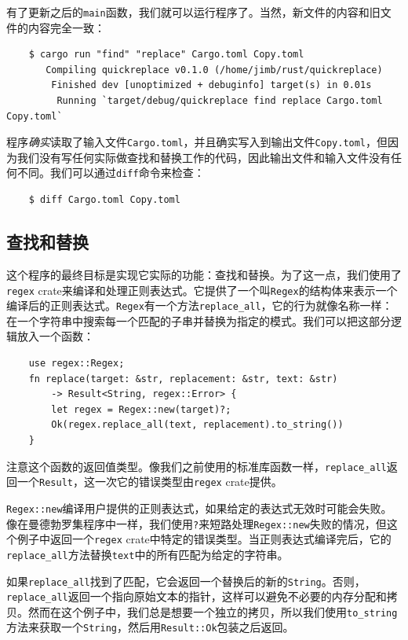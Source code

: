 有了更新之后的\texttt{main}函数，我们就可以运行程序了。当然，新文件的内容和旧文件的内容完全一致：
\begin{verbatim}
    $ cargo run "find" "replace" Cargo.toml Copy.toml
       Compiling quickreplace v0.1.0 (/home/jimb/rust/quickreplace)
        Finished dev [unoptimized + debuginfo] target(s) in 0.01s
         Running `target/debug/quickreplace find replace Cargo.toml Copy.toml`
\end{verbatim}

程序\emph{确实}读取了输入文件\texttt{Cargo.toml}，并且确实写入到输出文件\texttt{Copy.toml}，但因为我们没有写任何实际做查找和替换工作的代码，因此输出文件和输入文件没有任何不同。我们可以通过\texttt{diff}命令来检查：
\begin{verbatim}
    $ diff Cargo.toml Copy.toml
\end{verbatim}

\subsection{查找和替换}
这个程序的最终目标是实现它实际的功能：查找和替换。为了这一点，我们使用了\texttt{regex} crate来编译和处理正则表达式。它提供了一个叫\texttt{Regex}的结构体来表示一个编译后的正则表达式。\texttt{Regex}有一个方法\texttt{replace\_all}，它的行为就像名称一样：在一个字符串中搜索每一个匹配的子串并替换为指定的模式。我们可以把这部分逻辑放入一个函数：
\begin{verbatim}
    use regex::Regex;
    fn replace(target: &str, replacement: &str, text: &str)
        -> Result<String, regex::Error> {
        let regex = Regex::new(target)?;
        Ok(regex.replace_all(text, replacement).to_string())
    }
\end{verbatim}

注意这个函数的返回值类型。像我们之前使用的标准库函数一样，\texttt{replace\_all}返回一个\texttt{Result}，这一次它的错误类型由\texttt{regex} crate提供。

\texttt{Regex::new}编译用户提供的正则表达式，如果给定的表达式无效时可能会失败。像在曼德勃罗集程序中一样，我们使用\texttt{?}来短路处理\texttt{Regex::new}失败的情况，但这个例子中返回一个\texttt{regex} crate中特定的错误类型。当正则表达式编译完后，它的\texttt{replace\_all}方法替换\texttt{text}中的所有匹配为给定的字符串。

如果\texttt{replace\_all}找到了匹配，它会返回一个替换后的新的\texttt{String}。否则，\texttt{replace\_all}返回一个指向原始文本的指针，这样可以避免不必要的内存分配和拷贝。然而在这个例子中，我们总是想要一个独立的拷贝，所以我们使用\texttt{to\_string}方法来获取一个\texttt{String}，然后用\texttt{Result::Ok}包装之后返回。


